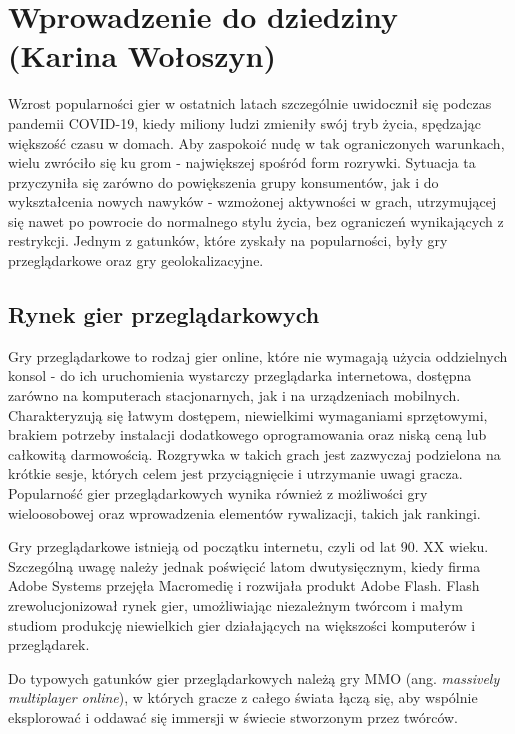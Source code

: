 \chapter{Wprowadzenie do dziedziny (Karina Wołoszyn)}
\label{chap:field}

Wzrost popularności gier w ostatnich latach szczególnie uwidocznił się podczas pandemii COVID-19, kiedy miliony ludzi zmieniły swój tryb życia, spędzając większość czasu w domach. Aby zaspokoić nudę w tak ograniczonych warunkach, wielu zwróciło się ku grom - największej spośród form rozrywki. Sytuacja ta przyczyniła się zarówno do powiększenia grupy konsumentów, jak i do wykształcenia nowych nawyków - wzmożonej aktywności w grach, utrzymującej się nawet po powrocie do normalnego stylu życia, bez ograniczeń wynikających z restrykcji. Jednym z gatunków, które zyskały na popularności, były gry przeglądarkowe oraz gry geolokalizacyjne.

\section{Rynek gier przeglądarkowych}

Gry przeglądarkowe to rodzaj gier online, które nie wymagają użycia oddzielnych konsol - do ich uruchomienia wystarczy przeglądarka internetowa, dostępna zarówno na komputerach stacjonarnych, jak i na urządzeniach mobilnych. Charakteryzują się łatwym dostępem, niewielkimi wymaganiami sprzętowymi, brakiem potrzeby instalacji dodatkowego oprogramowania oraz niską ceną lub całkowitą darmowością. Rozgrywka w takich grach jest zazwyczaj podzielona na krótkie sesje, których celem jest przyciągnięcie i utrzymanie uwagi gracza. Popularność gier przeglądarkowych wynika również z możliwości gry wieloosobowej oraz wprowadzenia elementów rywalizacji, takich jak rankingi.

Gry przeglądarkowe istnieją od początku internetu, czyli od lat 90. XX wieku. Szczególną uwagę należy jednak poświęcić latom dwutysięcznym, kiedy firma Adobe Systems przejęła Macromedię i rozwijała produkt Adobe Flash. Flash zrewolucjonizował rynek gier, umożliwiając niezależnym twórcom i małym studiom produkcję niewielkich gier działających na większości komputerów i przeglądarek.

Do typowych gatunków gier przeglądarkowych należą gry MMO (ang. \textit{massively multiplayer online}), w których gracze z całego świata łączą się, aby wspólnie eksplorować i oddawać się immersji w świecie stworzonym przez twórców.

